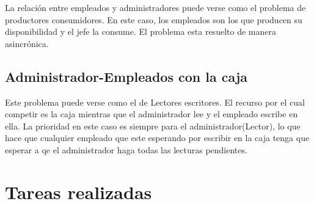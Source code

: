 \documentclass[12pt,a4paper,titlepage,oneside]{article}
\begin{document}
La relación entre empleados y administradores puede verse como el problema de productores consumidores. En este caso, los empleados son los que producen su disponibilidad y el jefe la consume. El problema esta resuelto de manera asincrónica.

\subsection*{Administrador-Empleados con la caja}

Este problema puede verse como el de Lectores escritores. El recurso por el cual competir es la caja mientras que el administrador lee y el empleado escribe en ella. La prioridad en este caso es siempre para el administrador(Lector), lo que hace que cualquier empleado que este esperando por escribir en la caja tenga que esperar a qe el administrador haga todas las lecturas pendientes.




\section{Tareas realizadas}
\end{document}
